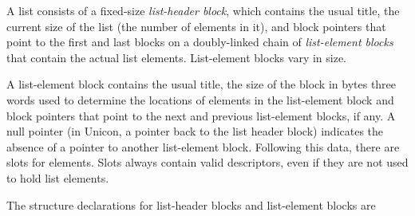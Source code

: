 A list consists of a fixed-size \textit{list-header block}, which
contains the usual title, the current size of the list (the number of
elements in it), and block pointers that point to the first and last
blocks on a doubly-linked chain of \textit{list-element blocks} that
contain the actual list elements. List-element blocks vary in size.


A list-element block contains the usual title, the size of the block
in bytes three words used to determine the locations of elements in
the list-element block and block pointers that point to the next and
previous list-element blocks, if any. A null pointer
\textcolor[rgb]{0.0,0.2784314,1.0}{(in Unicon, a pointer back to the
list header block)} indicates the absence of a pointer to another
list-element block. Following this data, there are slots for
elements. Slots always contain valid descriptors, even if they are not
used to hold list elements.


The structure declarations for list-header blocks and list-element blocks are

